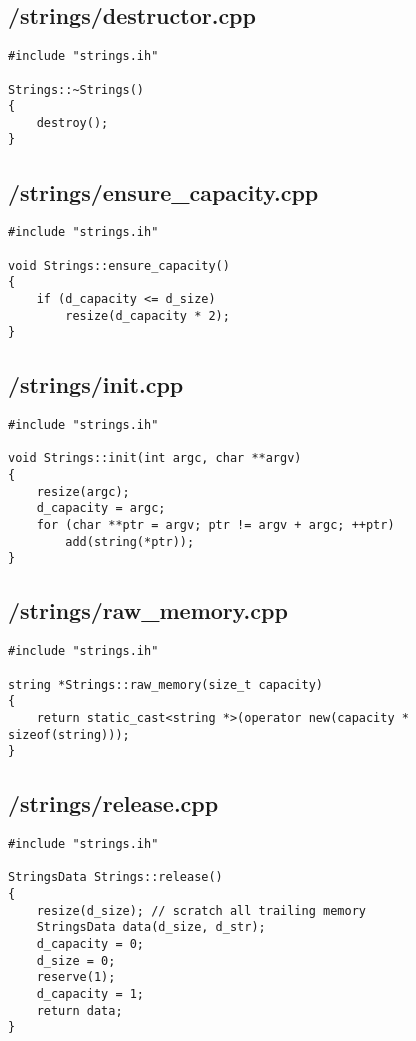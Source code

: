 \documentclass{article}
\begin{document}
\subsection*{/strings/destructor.cpp}
\begin{verbatim}
#include "strings.ih"

Strings::~Strings()
{
    destroy();
}
\end{verbatim}
\subsection*{/strings/ensure\_capacity.cpp}
\begin{verbatim}
#include "strings.ih"

void Strings::ensure_capacity()
{
    if (d_capacity <= d_size)
        resize(d_capacity * 2);
}
\end{verbatim}
\subsection*{/strings/init.cpp}
\begin{verbatim}
#include "strings.ih"

void Strings::init(int argc, char **argv)
{
    resize(argc);
    d_capacity = argc;
    for (char **ptr = argv; ptr != argv + argc; ++ptr)
        add(string(*ptr));
}
\end{verbatim}
\subsection*{/strings/raw\_memory.cpp}
\begin{verbatim}
#include "strings.ih"

string *Strings::raw_memory(size_t capacity)
{
    return static_cast<string *>(operator new(capacity * sizeof(string)));
}
\end{verbatim}
\subsection*{/strings/release.cpp}
\begin{verbatim}
#include "strings.ih"

StringsData Strings::release()
{
    resize(d_size); // scratch all trailing memory
    StringsData data(d_size, d_str);
    d_capacity = 0;
    d_size = 0;
    reserve(1);
    d_capacity = 1;
    return data;
}
\end{verbatim}
\end{document}
